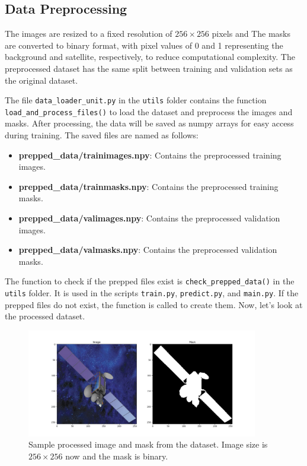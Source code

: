 \documentclass{article}
\begin{document}
\subsection{Data Preprocessing}

The images
are resized to a fixed resolution of $256 \times 256$ pixels and The masks are converted to binary format, with 
pixel values of 0 and 1 representing the background and satellite, respectively, to reduce computational
complexity. The preprocessed dataset has the same split between training and validation sets as the 
original dataset.
\vspace{1em}

The file \texttt{data\_loader\_unit.py} in the \texttt{utils} folder contains the function 
\texttt{load\_and\_process\_files()} to load the dataset and preprocess the images and masks. After processing, 
the data will be saved as numpy arrays for easy access during training. The saved files are named as follows:

\begin{itemize}
    \item \textbf{prepped\_data/trainimages.npy}: Contains the preprocessed training images.
    \item \textbf{prepped\_data/trainmasks.npy}: Contains the preprocessed training masks.
    \item \textbf{prepped\_data/valimages.npy}: Contains the preprocessed validation images.
    \item \textbf{prepped\_data/valmasks.npy}: Contains the preprocessed validation masks.
\end{itemize}
\vspace{1em}

The function to check if the prepped files exist is \texttt{check\_prepped\_data()} in the \texttt{utils} folder.
It is used in the scripts \texttt{train.py}, \texttt{predict.py}, and \texttt{main.py}. If the prepped files 
do not exist, the function is called to create them. Now, let's look at the processed dataset.

\begin{figure}[h]
    \centering
    \includegraphics[width=0.9\textwidth]{../images/processed_input_sample.png}
    \caption{Sample processed image and mask from the dataset. Image size is $256 \times 256$ now and the mask is binary.}
    \label{fig:preprocessed_dataset}
\end{figure}
\end{document}
